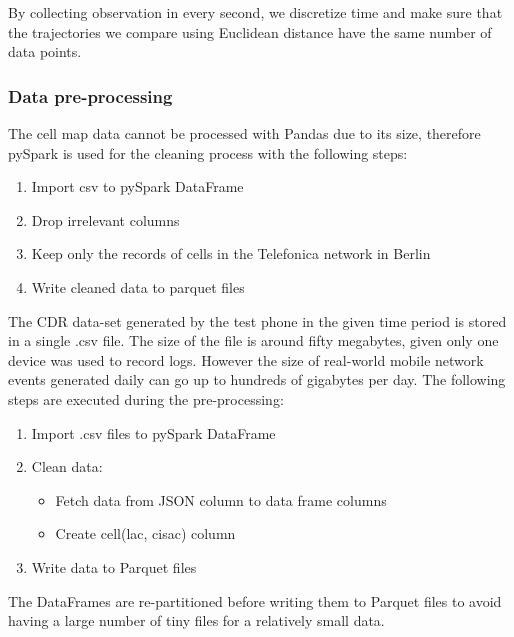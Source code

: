 By collecting observation in every second, we discretize time and make sure that the trajectories we compare using Euclidean distance have the same number of data points.

\subsubsection{Data pre-processing}
The cell map data cannot be processed with Pandas due to its size, therefore pySpark is used for the cleaning process with the following steps: 
\begin{enumerate}
    \item Import csv to pySpark DataFrame
    \item Drop irrelevant columns
    \item Keep only the records of cells in the Telefonica network in Berlin
    \item Write cleaned data to parquet files
\end{enumerate}

The CDR data-set generated by the test phone in the given time period is stored in a single .csv file. The size of the file is around fifty megabytes, given only one device was used to record logs. However the size of real-world mobile network events generated daily can go up to hundreds of gigabytes per day. The following steps are executed during the pre-processing: 
\begin{enumerate}
   \item Import .csv files to pySpark DataFrame
    \item Clean data:
    \begin{itemize}
        \item Fetch data from JSON column to data frame columns
        \item Create cell(lac, cisac) column
    \end{itemize}
    \item Write data to Parquet files
\end{enumerate}

The DataFrames are re-partitioned before writing them to Parquet files to avoid having a large number of tiny files for a relatively small data. 

